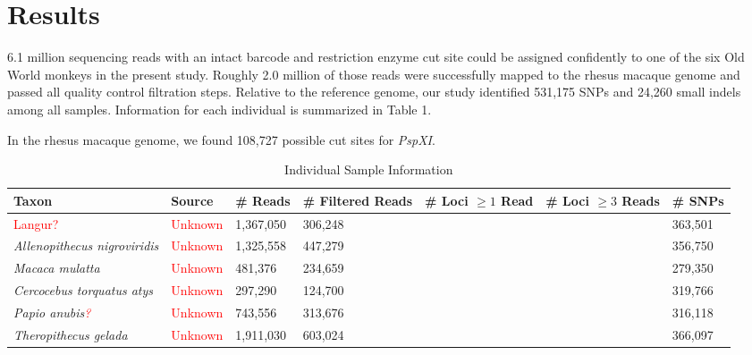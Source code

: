 \documentclass[12pt]{article}
\begin{document}

\section{Results}


6.1 million sequencing reads with an intact barcode and restriction enzyme cut site could be assigned confidently to one of the six Old World monkeys in the present study. Roughly 2.0 million of those reads were successfully mapped to the rhesus macaque genome and passed all quality control filtration steps. Relative to the reference genome, our study identified 531,175 SNPs and 24,260 small indels among all samples. Information for each individual is summarized in Table 1. 

In the rhesus macaque genome, we found 108,727 possible cut sites for \emph{PspXI}.

\begin{table}[h]
\caption{Individual Sample Information}
\begin{center}
	\small
	\begin{tabular}{ p{3cm} || l || p{1.75cm} | p{1.75cm} || p{1.75cm} | p{1.75cm} | l }
		\hline
		Taxon & Source & \# Reads & \# Filtered Reads & \# Loci $\ge 1$ Read & \# Loci $\ge 3$ Reads & \# SNPs \\ \hline\hline
		\textcolor{red}{Langur?} & \textcolor{red}{Unknown} & 1,367,050 & 306,248 & & & 363,501 \\ \hline
		\emph{Allenopithecus nigroviridis} & \textcolor{red}{Unknown} & 1,325,558 & 447,279 & & & 356,750 \\ \hline
		\emph{Macaca mulatta} & \textcolor{red}{Unknown} & 481,376 & 234,659 & & & 279,350 \\ \hline
		\emph{Cercocebus torquatus atys} & \textcolor{red}{Unknown} & 297,290 & 124,700 & & & 319,766 \\ \hline
		\emph{Papio anubis\textcolor{red}{?}} & \textcolor{red}{Unknown} & 743,556 & 313,676 & & & 316,118 \\ \hline
		\emph{Theropithecus gelada} & \textcolor{red}{Unknown} & 1,911,030 & 603,024 & & & 366,097 \\
		\hline
	\end{tabular}
\end{center}
\end{table}
\end{document}
